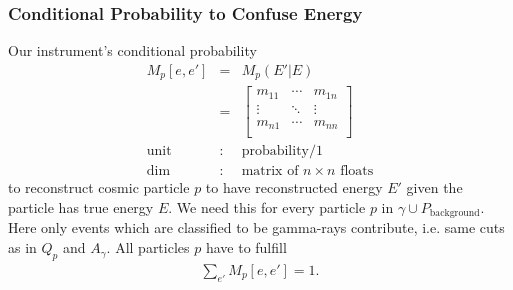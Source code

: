 \documentclass{article}%
\begin{document}
\subsubsection*{Conditional Probability to Confuse Energy}
%
Our instrument's conditional probability
%
\begin{eqnarray*}
M_p[e, e'] &=& M_p(E' \vert E)\\
&=&
  \left[ {\begin{array}{ccc}
    m_{11} & \cdots & m_{1n}\\
    \vdots & \ddots & \vdots\\
    m_{n1} & \cdots & m_{nn}\\
  \end{array} } \right]\\
\text{unit} &:& \text{probability}/1\\
\text{dim} &:& \text{matrix of}\,\,n \times n \,\,\text{floats}
\end{eqnarray*}
%
to reconstruct cosmic particle $p$ to have reconstructed energy $E'$ given the particle has true energy $E$.
%
We need this for every particle $p$ in $\gamma \cup P_\text{background}$.
%
Here only events which are classified to be gamma-rays contribute, i.e. same cuts as in $Q_p$ and $A_\gamma$.
%
All particles $p$ have to fulfill
%
\begin{eqnarray*}
\sum_{e'} M_p[e, e'] = 1.
\end{eqnarray*}
%
\end{document}
